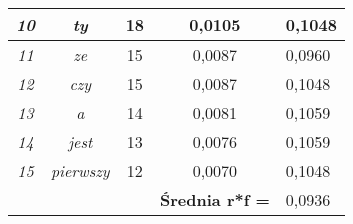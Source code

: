 \documentclass[a4paper]{article}
\begin{document}
\begin{table}
\begin{tabular}{ccc|c|l|}
\multicolumn{1}{|c|}{\textit{10}}                & \multicolumn{1}{c|}{\textit{ty}}       & 18                                & 0,0105                                     & 0,1048 \\ \hline
\multicolumn{1}{|c|}{\textit{11}}                & \multicolumn{1}{c|}{\textit{ze}}       & 15                                & 0,0087                                     & 0,0960 \\ \hline
\multicolumn{1}{|c|}{\textit{12}}                & \multicolumn{1}{c|}{\textit{czy}}      & 15                                & 0,0087                                     & 0,1048 \\ \hline
\multicolumn{1}{|c|}{\textit{13}}                & \multicolumn{1}{c|}{\textit{a}}        & 14                                & 0,0081                                     & 0,1059 \\ \hline
\multicolumn{1}{|c|}{\textit{14}}                & \multicolumn{1}{c|}{\textit{jest}}     & 13                                & 0,0076                                     & 0,1059 \\ \hline
\multicolumn{1}{|c|}{\textit{15}}                & \multicolumn{1}{c|}{\textit{pierwszy}} & 12                                & 0,0070                                     & 0,1048 \\ \hline
\multicolumn{1}{l}{}                             &                                        &                                   & \textbf{Średnia r*f =}                     & 0,0936 \\ \cline{4-5} 
\end{tabular}
\end{table}
\end{document}
